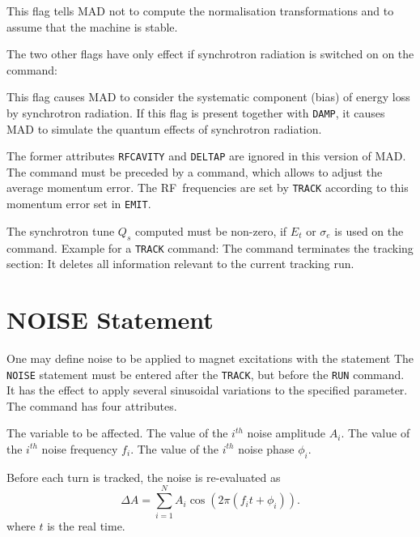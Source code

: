 \begin{mylist}
This flag tells MAD not to compute the normalisation transformations
and to assume that the machine is stable.
\end{mylist}
 
The two other flags have only effect if synchrotron radiation is
switched on on the  command:
 
\begin{mylist}
This flag causes MAD to consider the systematic component
(bias) of energy loss by synchrotron radiation.
If this flag is present together with {\tt DAMP},
it causes MAD to simulate the quantum effects of synchrotron radiation.
\end{mylist}
 
The former attributes {\tt RFCAVITY} and {\tt DELTAP} are ignored in
this version of MAD.
The  command must be preceded by a 
command, which allows to adjust the average momentum error.
The RF~frequencies are set by {\tt TRACK} according to this momentum
error set in {\tt EMIT}.
 
The synchrotron tune \(Q_{s}\) computed must be non-zero,
if \(E_{t}\) or \(\sigma_{e}\) is used on the  command.
Example for a {\tt TRACK} command:
The  command terminates the tracking section:
It deletes all information relevant to the current tracking run.
 
\section{NOISE Statement}
\label{S-NOISE}
One may define noise to be applied to magnet excitations
with the  statement
The {\tt NOISE} statement must be entered after the {\tt TRACK},
but before the {\tt RUN} command.
It has the effect to apply several sinusoidal variations to the
specified parameter.
The command has four attributes.
\begin{mylist}
The variable to be affected.
The value of the \(i^{th}\) noise amplitude \(A_i\).
The value of the \(i^{th}\) noise frequency \(f_i\).
The value of the \(i^{th}\) noise phase \(\phi_i\).
\end{mylist}
Before each turn is tracked, the noise is re-evaluated as
\[
\Delta A = \sum_{i=1}^N A_i \cos ( 2\pi (f_i t + \phi_i)).
\]
where \(t\) is the real time.
 
